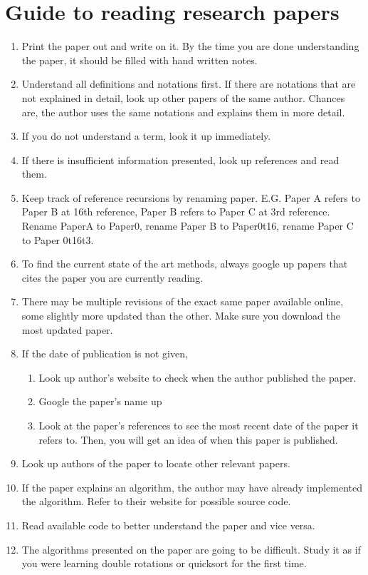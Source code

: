 \documentclass[a4paper,12pt]{article}
\begin{document}
\section{Guide to reading research papers}
	\begin{enumerate}
		\item Print the paper out and write on it. By the time you are done 					 			  understanding the paper, it should be filled with hand written notes. 
		\item Understand all definitions and notations first. If there are notations that are not explained in detail, look up other papers of the same author. Chances are, the author uses the same notations and explains them in more detail. 
		\item If you do not understand a term, look it up immediately. 
		\item If there is insufficient information presented, look up references and read them.
		\item Keep track of reference recursions by renaming paper. 
			 E.G. Paper A refers to Paper B at 16th reference, Paper B refers to Paper C at 3rd 				reference. Rename PaperA to Paper0, rename Paper B to Paper0t16, rename Paper C to 					Paper 0t16t3. 
		\item To find the current state of the art methods, always google up papers that cites the paper you are currently reading. 
		\item There may be multiple revisions of the exact same paper available online, some slightly more updated than the other. Make sure you download the most updated paper. 
		\item If the date of publication is not given,
		\begin{enumerate}
			\item Look up author's website to check when the author published the paper. 
			\item Google the paper's name up 
			\item Look at the paper's references to see the most recent date of the paper it refers to. Then, you will get an idea of when this paper is published. 
		\end{enumerate}
		\item Look up authors of the paper to locate other relevant papers. 
		\item If the paper explains an algorithm, the author may have already implemented the algorithm. Refer to their website for possible source code. 
		\item Read available code to better understand the paper and vice versa. 
		\item The algorithms presented on the paper are going to be difficult. Study it as if you were learning double rotations or quicksort for the first time. 
	\end{enumerate}
\end{document}
